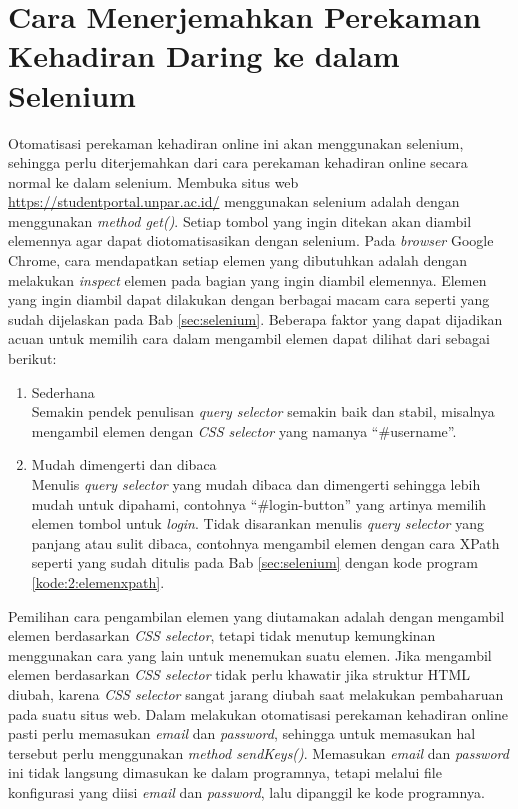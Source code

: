 \section{Cara Menerjemahkan Perekaman Kehadiran Daring ke dalam Selenium}
\label{sec:terjemah} 
Otomatisasi perekaman kehadiran online ini akan menggunakan selenium, sehingga perlu diterjemahkan dari cara perekaman kehadiran online secara normal ke dalam selenium. Membuka situs web \url{https://studentportal.unpar.ac.id/} menggunakan selenium adalah dengan menggunakan \textit{method get()}. Setiap tombol yang ingin ditekan akan diambil elemennya agar dapat diotomatisasikan dengan selenium. Pada \textit{browser} Google Chrome, cara mendapatkan setiap elemen yang dibutuhkan adalah dengan melakukan \textit{inspect} elemen pada bagian yang ingin diambil elemennya. Elemen yang ingin diambil dapat dilakukan dengan berbagai macam cara seperti yang sudah dijelaskan pada Bab \ref{sec:selenium}. Beberapa faktor yang dapat dijadikan acuan untuk memilih cara dalam mengambil elemen dapat dilihat dari sebagai berikut:
\begin{enumerate}
	\item Sederhana \\
	Semakin pendek penulisan \textit{query selector} semakin baik dan stabil, misalnya mengambil elemen dengan \textit{CSS selector} yang namanya ``\#username''.
	\item Mudah dimengerti dan dibaca \\
	Menulis \textit{query selector} yang mudah dibaca dan dimengerti sehingga lebih mudah untuk dipahami, contohnya ``\#login-button'' yang artinya memilih elemen tombol untuk \textit{login}. Tidak disarankan menulis \textit{query selector} yang panjang atau sulit dibaca, contohnya mengambil elemen dengan cara XPath seperti yang sudah ditulis pada Bab \ref{sec:selenium} dengan kode program \ref{kode:2:elemenxpath}.
\end{enumerate}
Pemilihan cara pengambilan elemen yang diutamakan adalah dengan mengambil elemen berdasarkan \textit{CSS selector}, tetapi tidak menutup kemungkinan menggunakan cara yang lain untuk menemukan suatu elemen. Jika mengambil elemen berdasarkan \textit{CSS selector} tidak perlu khawatir jika struktur HTML diubah, karena \textit{CSS selector} sangat jarang diubah saat melakukan pembaharuan pada suatu situs web. 
Dalam melakukan otomatisasi perekaman kehadiran online pasti perlu memasukan \textit{email} dan \textit{password}, sehingga untuk memasukan hal tersebut perlu menggunakan \textit{method sendKeys()}. Memasukan \textit{email} dan \textit{password} ini tidak langsung dimasukan ke dalam programnya, tetapi melalui file konfigurasi yang diisi \textit{email} dan \textit{password}, lalu dipanggil ke kode programnya. 

